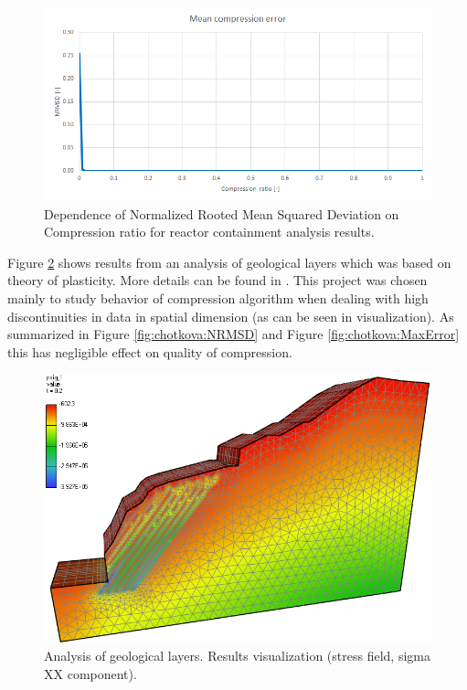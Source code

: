 \begin{figure}[H]
\centering\includegraphics[width=\textwidth]{figures/temelin_NRMSD}
\caption{Dependence of Normalized Rooted Mean Squared Deviation on Compression ratio for reactor containment analysis results.}
\label{fig:temelin:NRMSD}
\end{figure}

Figure \ref{fig:chotkova:mesh} shows results from an analysis of geological layers which was based on theory of plasticity. More details can be found in \cite{Koudelka2006}. This project was chosen mainly to study behavior of compression algorithm when dealing with high discontinuities in data in spatial dimension (as can be seen in visualization). As summarized in Figure \ref{fig:chotkova:NRMSD} and Figure \ref{fig:chotkova:MaxError} this has negligible effect on quality of compression.

\begin{figure}[H]
\centering\includegraphics[width=\textwidth]{figures/chotkova_screenshot}
\caption{Analysis of geological layers. Results visualization (stress field, sigma XX component).}
\label{fig:chotkova:mesh}
\end{figure}

